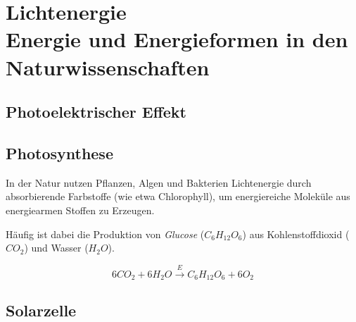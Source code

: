 \section[Lichtenergie\hfill Energie und Energieformen in den Naturwissenschaften]{Lichtenergie\\{\normalsize Energie und Energieformen in den Naturwissenschaften}}

\subsection{Photoelektrischer Effekt}\label{subsec:photoeffekt}

\subsection{Photosynthese}
In der Natur nutzen Pflanzen, Algen und Bakterien Lichtenergie durch absorbierende Farbstoffe (wie etwa Chlorophyll), um energiereiche Moleküle aus energiearmen Stoffen zu Erzeugen.


Häufig ist dabei die Produktion von \textit{Glucose} ($C_6H_{12}O_6$) aus Kohlenstoffdioxid ($CO_2$) und Wasser ($H_2O$).

$$6CO_2 + 6H_2O \xrightarrow{E} C_6H_{12}O_6 + 6O_2$$

\subsection{Solarzelle}
